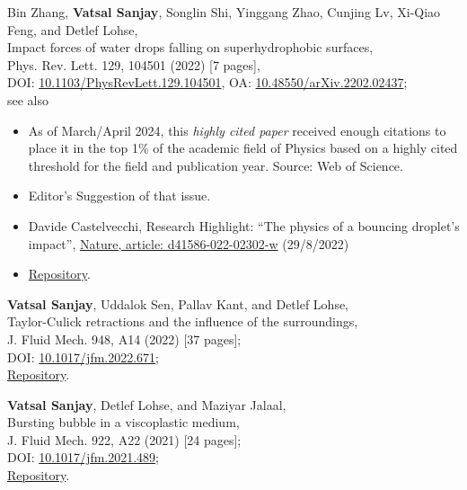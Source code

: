 	\item Bin Zhang, \textbf{Vatsal Sanjay}, Songlin Shi, Yinggang Zhao, Cunjing Lv, Xi-Qiao Feng, and Detlef Lohse,\\
	Impact forces of water drops falling on superhydrophobic surfaces,\\
	Phys. Rev. Lett. 129, 104501 (2022) [7 pages],\\
	\faLock\hspace{0.2em}DOI: \href{https://doi.org/10.1103/PhysRevLett.129.104501}{10.1103/PhysRevLett.129.104501}, \faFile\hspace{0.2em}OA: \href{https://doi.org/10.48550/arXiv.2202.02437}{10.48550/arXiv.2202.02437};\\
	see also
	\begin{itemize}
		\item
		\faChartLine\hspace{0.2em}As of March/April 2024, this \textit{highly cited paper} received enough citations to place it in the top 1\% of the academic field of Physics based on a highly cited threshold for the field and publication year. Source: Web of Science.
		\item
		\faStar\hspace{0.2em}Editor's Suggestion of that issue.
		\item
		Davide Castelvecchi, Research Highlight: ``The physics of a bouncing droplet's impact'', \href{https://www.nature.com/articles/d41586-022-02302-w}{Nature, article: d41586-022-02302-w} (29/8/2022)
		\item
		\faGithub\hspace{0.2em}\href{https://github.com/VatsalSy/Impact-forces-of-water-drops-falling-on-superhydrophobic-surfaces}{Repository}.
	\end{itemize}

	\item \textbf{Vatsal Sanjay}, Uddalok Sen, Pallav Kant, and Detlef Lohse,\\
	Taylor-Culick retractions and the influence of the surroundings,\\
	J. Fluid Mech. 948, A14 (2022) [37 pages];\\
	\faFile\hspace{0.2em}DOI: \href{https://doi.org/10.1017/jfm.2022.671}{10.1017/jfm.2022.671};\\
	\faGithub\hspace{0.2em}\href{https://github.com/VatsalSy/Taylor-Culick-retractions}{Repository}.

	\item \textbf{Vatsal Sanjay}, Detlef Lohse, and Maziyar Jalaal,\\
	Bursting bubble in a viscoplastic medium,\\
	J. Fluid Mech. 922, A22 (2021) [24 pages];\\
	\faFile\hspace{0.2em}DOI: \href{https://doi.org/10.1017/jfm.2021.489}{10.1017/jfm.2021.489};\\
	\faGithub\hspace{0.2em}\href{https://github.com/VatsalSy/Bursting-Bubble-In-a-Viscoplastic-Medium}{Repository}.

